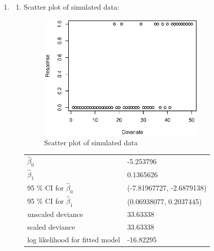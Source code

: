 \documentclass{article}
\begin{document}
\begin{enumerate}[leftmargin = 0 em, label = 3.\arabic*., font = \bfseries]
	\newpage
	\item 
	\begin{enumerate}[label = \arabic*.]
		\item 
		Scatter plot of simulated data:
		\begin{figure}[!htb]
			\centering
			\includegraphics[width = 0.8\textwidth]{2scatter.eps}
			\caption{Scatter plot of simulated data}
			\label{2scatter}
		\end{figure}

		\begin{center}
		 \begin{tabular}{ll}
		 \toprule
		 $\hat{\beta}_0$ & -5.253796\\
		 $\hat{\beta}_1$ & 0.1365626\\ 
		 95 \% CI for $\hat{\beta}_0$ &(-7.81967727, -2.6879138)\\
		 95 \% CI for $\hat{\beta}_1$ &(0.06938077, 0.2037445)\\
		 unscaled deviance & 33.63338\\
		 scaled deviance & 33.63338\\
		 log likelihood for fitted model &  -16.82295\\
		 \bottomrule
		 \end{tabular}
		 \end{center}


\end{enumerate}
\end{enumerate}
\end{document}
